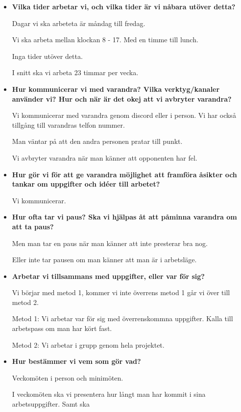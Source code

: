 \documentclass{mall}
\begin{document}
\begin{itemize}
\item \textbf{Vilka tider arbetar vi, och vilka tider är vi nåbara utöver detta?}

  Dagar vi ska arbeteta är måndag till fredag.

  Vi ska arbeta mellan klockan 8 - 17. Med en timme till lunch.

  Inga tider utöver detta.

  I snitt ska vi arbeta 23 timmar per vecka.

\item \textbf{Hur kommunicerar vi med varandra? Vilka verktyg/kanaler använder vi? Hur och när är det okej att vi avbryter varandra?}

  Vi kommunicerar med varandra genom discord eller i person. Vi har också tillgång till varandras telfon nummer.
  
  Man väntar på att den andra personen pratar till punkt.

  Vi avbryter varandra när man känner att opponenten har fel. 

\item \textbf{Hur gör vi för att ge varandra möjlighet att framföra åsikter och tankar om uppgifter och idéer till arbetet?}

  Vi kommunicerar.

\item \textbf{Hur ofta tar vi paus? Ska vi hjälpas åt att påminna varandra om att ta paus?}

  Men man tar en paus när man känner att inte presterar bra nog. 

  Eller inte tar pausen om man känner att man är i arbetsläge.

\item \textbf{Arbetar vi tillsammans med uppgifter, eller var för sig?}

  Vi börjar med metod 1, kommer vi inte överrens metod 1 går vi över till metod 2. 

  Metod 1: Vi arbetar var för sig med överrenskommna uppgifter. Kalla till arbetspass om man har kört fast. 

  Metod 2: Vi arbetar i grupp genom hela projektet.

\item \textbf{Hur bestämmer vi vem som gör vad?}

  Veckomöten i person och minimöten.
  
  I veckomöten ska vi presentera hur långt man har kommit i sina arbetsuppgifter. Samt ska   


\end{itemize}
\end{document}
